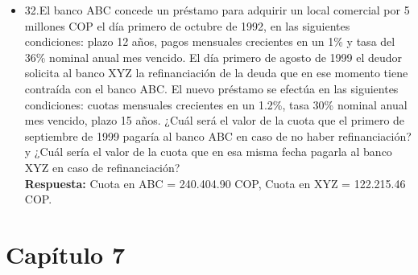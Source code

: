 \begin{itemize}
 \item 32.El banco ABC concede un préstamo para adquirir un local comercial por 5 millones COP el día primero de octubre de 1992, en las siguientes condiciones: plazo 12 años, pagos mensuales crecientes en un 1\% y tasa del 36\% nominal anual mes vencido. El día primero de agosto de 1999 el deudor solicita al banco XYZ la refinanciación de la deuda que en ese momento tiene contraída con el banco ABC. El nuevo préstamo se efectúa en las siguientes condiciones: cuotas mensuales crecientes en un 1.2\%, tasa 30\% nominal anual mes vencido, plazo 15 años. ¿Cuál será el valor de la cuota que el primero de septiembre de 1999 pagaría al banco ABC en caso de no haber refinanciación? y ¿Cuál sería el valor de la cuota que en esa misma fecha pagarla al banco XYZ en caso de refinanciación?\\
       \textbf{Respuesta:} Cuota en ABC = 240.404.90 COP, \hspace{1,0cm} Cuota en XYZ = 122.215.46 COP.\\

\end{itemize}

\chapter*{Capítulo 7}

